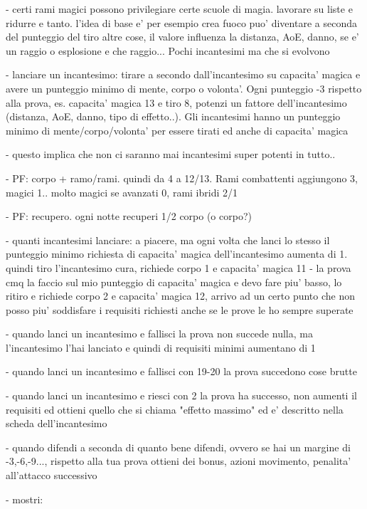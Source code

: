 \documentclass[12pt,a4paper,twoside,openany,twocolumn]{book}
\begin{document}
- certi rami magici possono privilegiare certe scuole di magia. lavorare su liste e ridurre e tanto. l'idea di base e' per esempio crea fuoco puo' diventare a seconda del punteggio del tiro altre cose, il valore influenza la distanza, AoE, danno, se e' un raggio o esplosione e che raggio...  Pochi incantesimi ma che si evolvono

- lanciare un incantesimo: tirare a secondo dall'incantesimo su capacita' magica e avere un punteggio minimo di  mente, corpo o volonta'.  Ogni punteggio -3 rispetto alla prova, es. capacita' magica 13 e tiro 8, potenzi un fattore dell'incantesimo (distanza, AoE, danno, tipo di effetto..). Gli incantesimi hanno un punteggio minimo di mente/corpo/volonta' per essere tirati ed anche di capacita' magica

- questo implica che non ci saranno mai incantesimi super potenti in tutto..

- PF: corpo + ramo/rami. quindi da 4 a 12/13. Rami combattenti aggiungono 3, 
magici 1.. molto magici se avanzati 0, rami ibridi 2/1

- PF: recupero. ogni notte recuperi 1/2 corpo (o corpo?)

- quanti incantesimi lanciare:  a piacere, ma ogni volta che lanci lo stesso il punteggio minimo richiesta di capacita' magica dell'incantesimo aumenta di 1. quindi tiro l'incantesimo cura, richiede corpo 1 e capacita' magica 11 - la prova cmq la faccio sul mio punteggio di capacita' magica e devo fare piu' basso, lo ritiro e richiede corpo 2 e capacita' magica 12, arrivo ad un certo punto che non posso piu' soddisfare i requisiti richiesti anche se le prove le ho sempre superate

- quando lanci un incantesimo e fallisci la prova non succede nulla, ma l'incantesimo l'hai lanciato e quindi di requisiti minimi aumentano di 1

- quando lanci un incantesimo e fallisci con 19-20 la prova succedono cose  brutte

- quando lanci un incantesimo e riesci con 2 la prova ha successo, non aumenti il requisiti ed ottieni quello che si chiama "effetto massimo" ed e' descritto nella scheda dell'incantesimo

- quando difendi  a seconda di quanto bene difendi, ovvero se hai un margine di -3,-6,-9..., rispetto alla tua prova ottieni dei bonus, azioni movimento, penalita' all'attacco successivo

- mostri:
\end{document}
